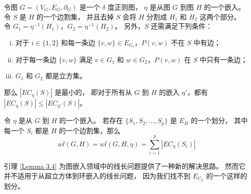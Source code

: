 \begin{lemma}[拥塞引理]
\label{Lemma 3.3}
令图 $G = (V_G, E_G, \partial_G)$ 是一个 $\delta$ 度正则图，
$\eta$ 是从图 $G$ 到图 $H$ 的一个嵌入。
令 $S$ 是 $H$ 的一个边割集，
并且去掉 $S$ 会将 $H$ 分割成 $H_1$ 和 $H_2$ 这两个部分。
令 $G_1 = \eta^{-1}(H_1)$，$G_2 = \eta^{-1}(H_2)$。
另外，$S$ 还需满足下列条件：
\begin{enumerate}[(i)]
\item 对于 $i \in \{1, 2\}$ 和每一条边 $\{v, w\} \in E_{G_i}$，$P(v, w)$ 不在 $S$ 中有边；
\item 对于每一条边 $\{v, w\}$ 满足 $v \in G_1$ 和 $w \in G_2$，$P(v, w)$ 在 $S$ 中只有一条边；
\item $G_1$ 和 $G_2$ 都是立方集。
\end{enumerate}
那么 $|EC_\eta(S)|$ 是最小的，
即对于所有从 $G$ 到 $H$ 的嵌入 $\eta'$，都有 $|EC_\eta(S)| \le |EC_{\eta'}(S)|$。
\end{lemma}

\begin{lemma}[划分引理]
\label{Lemma 3.4}
令 $\eta$ 是从 $G$ 到 $H$ 的一个嵌入。
若存在 $\{S_1, S_2, \dots, S_p\}$ 是 $E_H$ 的一个划分，
其中每一个 $S_i$ 都是 $H$ 的一个边割集，那么
\begin{equation*}
wl(G, H) = wl(G, H, \eta) = \sum_{i = 1}^p |EC_\eta(S_i)|
\end{equation*}
\end{lemma}

引理 \ref{Lemma 3.4} 为图嵌入领域中的线长问题提供了一种新的解决思路。
然而它并不适用于从超立方体到环嵌入的线长问题，
因为我们找不到 $E_{C_n}$ 的一个这样的划分。
